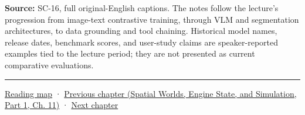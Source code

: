 \textbf{Source:} SC-16, full original-English captions. The notes follow the lecture's progression from image-text contrastive training, through VLM and segmentation architectures, to data grounding and tool chaining. Historical model names, release dates, benchmark scores, and user-study claims are speaker-reported examples tied to the lecture period; they are not presented as current comparative evaluations.

\begin{center}\rule{0.5\linewidth}{0.5pt}\end{center}

\hyperref[volume-reading-map]{Reading map} · \href{../05-Spatial-Worlds-Engine-State-and-Simulation-P01/main.pdf\#nameddest=04-visual-computing-ii-ch030-mesh-operators-boundaries-and-diffusion}{Previous chapter (Spatial Worlds, Engine State, and Simulation, Part 1, Ch. 11)} · \hyperref[04-visual-computing-ii-ch032-pose-estimation-and-robust-fitting]{Next chapter}
